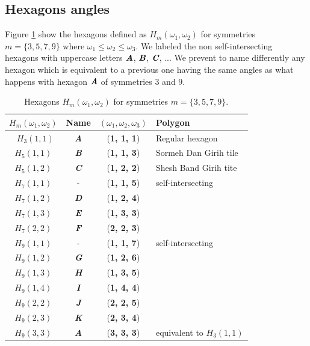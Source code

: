 \documentclass[11pt]{article}
\def\mathbi#1{\textbf{\em #1}}
\begin{document}
\subsection{Hexagons angles}


Figure \ref{tbl:hexagons-angles} show the hexagons defined as $H_m(\omega_1,\omega_2)$ for symmetries $m = \{3,5,7,9\}$ where $\omega_1 \leq \omega_2 \leq \omega_3$. We labeled the non self-intersecting hexagons with uppercase letters $\mathbi{A}$, $\mathbi{B}$, $\mathbi{C}$, ... We prevent to name differently any hexagon which is equivalent to a previous one having the same angles as what happens with hexagon $\mathbi{A}$ of symmetries $3$ and $9$.

\begin{table}[H]
\begin{center}
\begin{tabular}{| c | c | c | l | }
\hline
$H_m(\omega_1,\omega_2)$ & Name & $(\omega_1, \omega_2, \omega_3)$ & Polygon \\ \hline\
$H_3(1,1)$ & \mathbi{A} & (\textbf{1, 1, 1}) & Regular hexagon \\[0.5ex]
\hline
$H_5(1,1)$ & \mathbi{B} & (\textbf{1, 1, 3}) & Sormeh Dan Girih tile\\[0.5ex]
$H_5(1,2)$ & \mathbi{C} & (\textbf{1, 2, 2}) & Shesh Band Girih tite\\[0.5ex]
\hline
$H_7(1,1)$ & -          & (\textbf{1, 1, 5}) & self-intersecting \\[0.5ex]
$H_7(1,2)$ & \mathbi{D} & (\textbf{1, 2, 4}) & \\[0.5ex]
$H_7(1,3)$ & \mathbi{E} & (\textbf{1, 3, 3}) & \\[0.5ex]
$H_7(2,2)$ & \mathbi{F} & (\textbf{2, 2, 3}) & \\[0.5ex]
\hline
$H_9(1,1)$ & -          & (\textbf{1, 1, 7}) & self-intersecting \\[0.5ex]
$H_9(1,2)$ & \mathbi{G} & (\textbf{1, 2, 6}) & \\[0.5ex]
$H_9(1,3)$ & \mathbi{H} & (\textbf{1, 3, 5}) & \\[0.5ex]
$H_9(1,4)$ & \mathbi{I} & (\textbf{1, 4, 4}) & \\[0.5ex]
$H_9(2,2)$ & \mathbi{J} & (\textbf{2, 2, 5}) & \\[0.5ex]
$H_9(2,3)$ & \mathbi{K} & (\textbf{2, 3, 4}) & \\[0.5ex]
$H_9(3,3)$ & \mathbi{A} & (\textbf{3, 3, 3}) & equivalent to $H_3(1,1)$\\[1.1ex]
\hline
\end{tabular}
\caption{Hexagons $H_m(\omega_1,\omega_2)$ for symmetries $m = \{3,5,7,9\}$.} 
\label{tbl:hexagons-angles}
\end{center}
\end{table}
\end{document}
